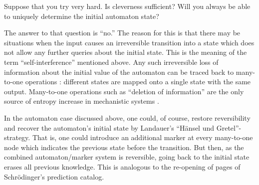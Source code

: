 Suppose that you try very hard. Is cleverness sufficient?
Will you always be able to uniquely determine the initial automaton
state?

The answer to that question is ``no.'' The reason for this
is that there may be situations when the input causes an irreversible
transition into a state which does not allow any
further queries about the initial state.
This is the meaning of the term
``self-interference'' mentioned above.
Any such irreversible loss of information about the initial value of the
automaton can be traced back
to many-to-one operations \cite{landauer}: different states
are mapped onto a single state with the same output. Many-to-one
operations such as ``deletion of information'' are the only
source of entropy increase
in mechanistic systems \cite{landauer,bennett}.

In the automaton case discussed above, one could, of course,
restore reversibility and recover the automaton's initial state by
Landauer's
``H\"ansel und Gretel''-strategy. That is, one could introduce an
additional marker at every many-to-one node which indicates the
previous state before the transition. But then, as the combined
automaton/marker system is reversible, going back to the initial state
erases all previous knowledge. This is analogous to the
re-opening of pages of Schr\"odinger's prediction catalog.

